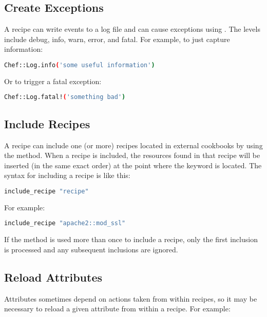 \subsection{Create Exceptions}

A recipe can write events to a log file and can cause exceptions using . The levels include debug, info, warn, error, and fatal. For example, to just capture information:

\begin{lstlisting}[language=Bash,label=lst:cookbook-recipes7]
Chef::Log.info('some useful information')
\end{lstlisting}

Or to trigger a fatal exception:

\begin{lstlisting}[language=Bash,label=lst:cookbook-recipes8]
Chef::Log.fatal!('something bad')
\end{lstlisting}

\subsection{Include Recipes}

A recipe can include one (or more) recipes located in external cookbooks by using the  method. When a recipe is included, the resources found in that recipe will be inserted (in the same exact order) at the point where the  keyword is located. The syntax for including a recipe is like this:

\begin{lstlisting}[language=Bash,label=lst:cookbook-recipes9]
include_recipe "recipe"
\end{lstlisting}

For example:

\begin{lstlisting}[language=Bash,label=lst:cookbook-recipes10]
include_recipe "apache2::mod_ssl"
\end{lstlisting}

If the  method is used more than once to include a recipe, only the first inclusion is processed and any subsequent inclusions are ignored.

\subsection{Reload Attributes}

Attributes sometimes depend on actions taken from within recipes, so it may be necessary to reload a given attribute from within a recipe. For example:

